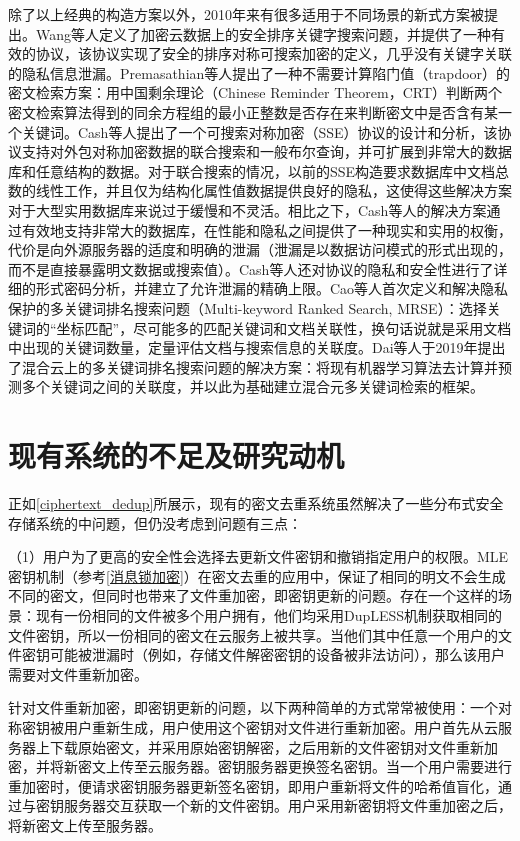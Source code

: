 \documentclass[promaster]{thesis-uestc}
\begin{document}
除了以上经典的构造方案以外，2010年来有很多适用于不同场景的新式方案被提出。Wang等人定义了加密云数据上的安全排序关键字搜索问题，并提供了一种有效的协议，该协议实现了安全的排序对称可搜索加密的定义，几乎没有关键字关联的隐私信息泄漏。Premasathian等人提出了一种不需要计算陷门值（trapdoor）的密文检索方案：用中国剩余理论（Chinese Reminder Theorem，CRT）判断两个密文检索算法得到的同余方程组的最小正整数是否存在来判断密文中是否含有某一个关键词。Cash等人提出了一个可搜索对称加密（SSE）协议的设计和分析，该协议支持对外包对称加密数据的联合搜索和一般布尔查询，并可扩展到非常大的数据库和任意结构的数据。对于联合搜索的情况，以前的SSE构造要求数据库中文档总数的线性工作，并且仅为结构化属性值数据提供良好的隐私，这使得这些解决方案对于大型实用数据库来说过于缓慢和不灵活。相比之下，Cash等人的解决方案通过有效地支持非常大的数据库，在性能和隐私之间提供了一种现实和实用的权衡，代价是向外源服务器的适度和明确的泄漏（泄漏是以数据访问模式的形式出现的，而不是直接暴露明文数据或搜索值）。Cash等人还对协议的隐私和安全性进行了详细的形式密码分析，并建立了允许泄漏的精确上限。Cao等人首次定义和解决隐私保护的多关键词排名搜索问题（Multi-keyword Ranked Search, MRSE）：选择关键词的“坐标匹配”，尽可能多的匹配关键词和文档关联性，换句话说就是采用文档中出现的关键词数量，定量评估文档与搜索信息的关联度。Dai等人于2019年提出了混合云上的多关键词排名搜索问题的解决方案：将现有机器学习算法去计算并预测多个关键词之间的关联度，并以此为基础建立混合元多关键词检索的框架。

\section{现有系统的不足及研究动机}\label{现有系统的不足和研究动机}
正如\ref{ciphertext_dedup}所展示，现有的密文去重系统虽然解决了一些分布式安全存储系统的中问题，但仍没考虑到问题有三点：

（1）用户为了更高的安全性会选择去更新文件密钥和撤销指定用户的权限。MLE密钥机制（参考\ref{消息锁加密}）在密文去重的应用中，保证了相同的明文不会生成不同的密文，但同时也带来了文件重加密，即密钥更新的问题。存在一个这样的场景：现有一份相同的文件被多个用户拥有，他们均采用DupLESS机制获取相同的文件密钥，所以一份相同的密文在云服务上被共享。当他们其中任意一个用户的文件密钥可能被泄漏时（例如，存储文件解密密钥的设备被非法访问），那么该用户需要对文件重新加密。

针对文件重新加密，即密钥更新的问题，以下两种简单的方式常常被使用：一个对称密钥被用户重新生成，用户使用这个密钥对文件进行重新加密。用户首先从云服务器上下载原始密文，并采用原始密钥解密，之后用新的文件密钥对文件重新加密，并将新密文上传至云服务器。密钥服务器更换签名密钥。当一个用户需要进行重加密时，便请求密钥服务器更新签名密钥，即用户重新将文件的哈希值盲化，通过与密钥服务器交互获取一个新的文件密钥。用户采用新密钥将文件重加密之后，将新密文上传至服务器。
\end{document}
